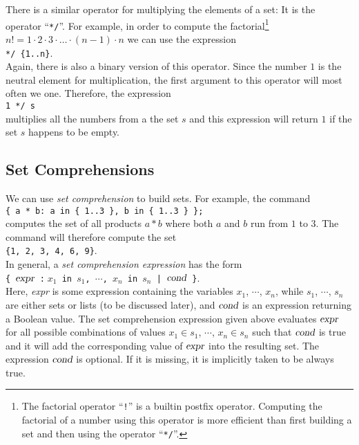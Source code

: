 There is a similar operator for multiplying the elements of a set: It is the operator
``\texttt{*/}''.
For example, in order to compute the factorial\footnote{
  The factorial operator ``\texttt{!}'' is a builtin postfix operator.  Computing
  the factorial of a number using this operator is more efficient than first building a set
  and then using the operator ``\texttt{*/}''.
}
$n! = 1 \cdot 2 \cdot 3 \cdot {\dots} \cdot (n-1) \cdot n$ we can use the expression
\\[0.2cm]
\hspace*{1.3cm}
\texttt{*/ \{1..n\}}.
\\[0.2cm]
Again, there is also a binary version of this operator.  Since the number $1$ is the
neutral element for  multiplication, the first argument to this operator will most often
we one.   Therefore, the expression
\\[0.2cm]
\hspace*{1.3cm}
\texttt{1 */ s}
\\[0.2cm]
 multiplies all the numbers from a the set $s$ and this expression will return $1$ if the
 set $s$ happens to be empty.

\subsection{Set Comprehensions}
We can use \emph{set comprehension} to build sets.  For example, the command
\\[0.2cm]
\hspace*{1.3cm}
\texttt{\{ a * b: a in \{ 1..3 \}, b in \{ 1..3 \} \};}
\\[0.2cm]
computes the set of all products $a * b$ where both $a$ and $b$ run from $1$ to $3$.
The command will therefore compute the set
\\[0.2cm]
\hspace*{1.3cm}
\texttt{\{1, 2, 3, 4, 6, 9\}}.
\\[0.2cm]
In general, a \emph{set comprehension expression} has the form
\\[0.2cm]
\hspace*{1.3cm}
\texttt{\{ $\textsl{expr}$ :$\;x_1$ in $s_1$, $\cdots$, $x_n$ in $s_n$ | $\textsl{cond}$ \}}.
\\[0.2cm]
Here, \textsl{expr} is some expression containing the variables $x_1$, $\cdots$, $x_n$, while
$s_1$, $\cdots$, $s_n$ are either sets or lists (to be discussed later), and $\textsl{cond}$ is an
expression returning a Boolean value.  
The  set comprehension expression given above evaluates $\textsl{expr}$ for all possible combinations of 
values $x_1 \in s_1$, $\cdots$, $x_n \in s_n$ such that $\textsl{cond}$ is true and it will add the
corresponding value of $\textsl{expr}$ into the resulting set.
The expression $\textsl{cond}$ is optional.  If it is missing, it is implicitly taken to be
always true.


